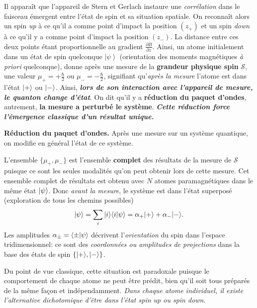 Il apparaît que l'appareil de Stern et Gerlach instaure une \emph{corrélation}
dans le faisceau émergent entre l'état de spin et sa situation spatiale. On
reconnaît alors un spin \emph{up} à ce qu'il a comme point d'impact la position
$(z_{+})$ et un spin \emph{down} à ce qu'il y a comme point d'impact la position
$(z_{-})$. La distance entre ces deux points étant proportionnelle au gradient
$\frac{\partial B}{\partial z}$. Ainsi, un atome initialement dans un état de
spin quelconque $\left\vert \psi \right\rangle $ (orientation des moments
magnétiques \emph{à priori} quelconque), donne après une mesure de la
\textbf{grandeur physique spin} $\mathcal{S}$, une valeur
$\mu_{+}=+\frac{\hbar}{2}$ ou $\mu_{-}=-\frac{\hbar }{2}$, signifiant
qu'\emph{après la mesure} l'atome est dans l'état $\vert+\rangle$ ou $\vert-\rangle$. Ainsi,
\textbf{\emph{lors de son interaction avec l'appareil de mesure, le quanton
change d'état}}. On dit qu'il y a \textbf{réduction du paquet d'ondes},
autrement, \textbf{la mesure a perturbé le système}. \emph{\textbf{Cette
réduction force l'émergence classique d'un résultat unique.}}

\colorbox[gray]{0.8}{
\parbox[c]{0.9\textwidth}{
\begin{principe}\textbf{Réduction du paquet d'ondes.} Après une mesure sur un
système quantique, on modifie en général l'état de ce système.
\end{principe}
}}\medskip

L'ensemble $\{\mu_{+},\mu_{-}\}$ est l'ensemble \textbf{complet } des résultats
de la mesure de $\mathcal{S}$ puisque ce sont les seules modalités qu'on peut
obtenir lors de cette mesure. Cet ensemble complet de résultats est obtenu avec
$N$ atomes paramagnétiques dans le même état $\vert\psi\rangle $. Donc \emph{avant la
mesure}, le système est dans l'état superposé (exploration de tous les chemins
possibles)
\begin{equation}
\vert\psi\rangle =\sum_{i}\vert i\rangle\langle i\vert\psi\rangle =\alpha_{+}\vert+\rangle+\alpha_{-}
\vert-\rangle.
\end{equation}
Les amplitudes $\alpha_{\pm}=\langle\pm\vert\psi\rangle$ décrivent
l'\emph{orientation} du spin dans l'espace tridimensionnel: ce sont des
\emph{coordonnées ou amplitudes de projections} dans la base des états de spin
$\{\vert+\rangle,\vert-\rangle\}$.

Du point de vue classique, cette situation est paradoxale puisque le
comportement de chaque atome ne peut être prédit, bien qu'il soit tous
préparés de la même façon et indépendamment. \emph{Dans chaque atome
individuel, il existe l'alternative dichotomique d'être dans l'état spin up ou
spin down}.

